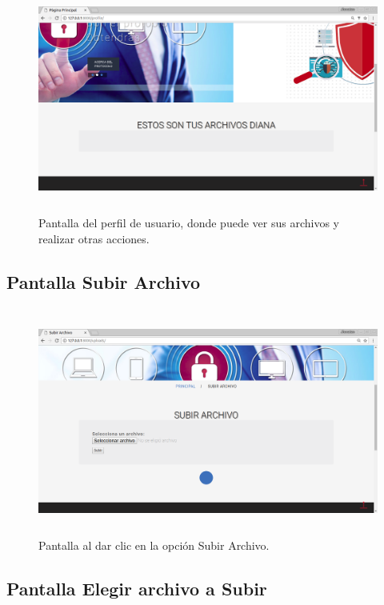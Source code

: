 			\begin{figure}[H]
			\centering
			\includegraphics[width=14cm, height=7.5cm]{./images/Implementacion/PantallaPerfil.png}
			\caption{Pantalla del perfil de usuario, donde puede ver sus archivos y realizar otras acciones.}
			\label{fig:6-1-9} 
			\end{figure}

\subsection{Pantalla Subir Archivo}

			\begin{figure}[H]
			\centering
			\includegraphics[width=14cm, height=7.5cm]{./images/Implementacion/PantallaSubirArchivo.png}
			\caption{Pantalla al dar clic en la opción Subir Archivo.}
			\label{fig:6-1-10} 
			\end{figure}

\subsection{Pantalla Elegir archivo a Subir}

